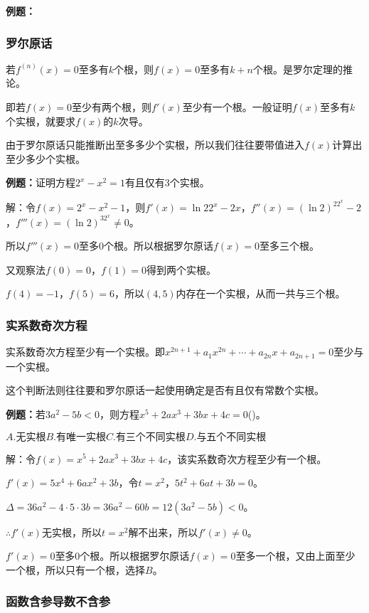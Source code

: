 \documentclass[UTF8, 12pt]{ctexart}
\begin{document}
\textbf{例题：}

\subsubsection{罗尔原话}

若$f^{(n)}(x)=0$至多有$k$个根，则$f(x)=0$至多有$k+n$个根。是罗尔定理的推论。

即若$f(x)=0$至少有两个根，则$f'(x)$至少有一个根。一般证明$f(x)$至多有$k$个实根，就要求$f(x)$的$k$次导。

由于罗尔原话只能推断出至多多少个实根，所以我们往往要带值进入$f(x)$计算出至少多少个实根。

\textbf{例题：}证明方程$2^x-x^2=1$有且仅有3个实根。

解：令$f(x)=2^x-x^2-1$，则$f'(x)=\ln22^x-2x$，$f''(x)=(\ln2)^22^x-2$，$f'''(x)=(\ln2)^32^x\neq 0$。

所以$f'''(x)=0$至多0个根。所以根据罗尔原话$f(x)=0$至多三个根。

又观察法$f(0)=0$，$f(1)=0$得到两个实根。

$f(4)=-1$，$f(5)=6$，所以$(4,5)$内存在一个实根，从而一共与三个根。

\subsubsection{实系数奇次方程}

实系数奇次方程至少有一个实根。即$x^{2n+1}+a_1x^{2n}+\cdots+a_{2n}x+a_{2n+1}=0$至少与一个实根。

这个判断法则往往要和罗尔原话一起使用确定是否有且仅有常数个实根。

\textbf{例题：}若$3a^2-5b<0$，则方程$x^5+2ax^3+3bx+4c=0$()。

$A.\text{无实根}$\qquad$B.\text{有唯一实根}$\qquad$C.\text{有三个不同实根}$\qquad$D.\text{与五个不同实根}$

解：令$f(x)=x^5+2ax^3+3bx+4c$，该实系数奇次方程至少有一个根。

$f'(x)=5x^4+6ax^2+3b$，令$t=x^2$，$5t^2+6at+3b=0$。

$\Delta=36a^2-4\cdot5\cdot3b=36a^2-60b=12(3a^2-5b)<0$。

$\therefore f'(x)$无实根，所以$t=x^2$解不出来，所以$f'(x)\neq0$。

$f'(x)=0$至多0个根。所以根据罗尔原话$f(x)=0$至多一个根，又由上面至少一个根，所以只有一个根，选择$B$。

\subsubsection{函数含参导数不含参}
\end{document}
